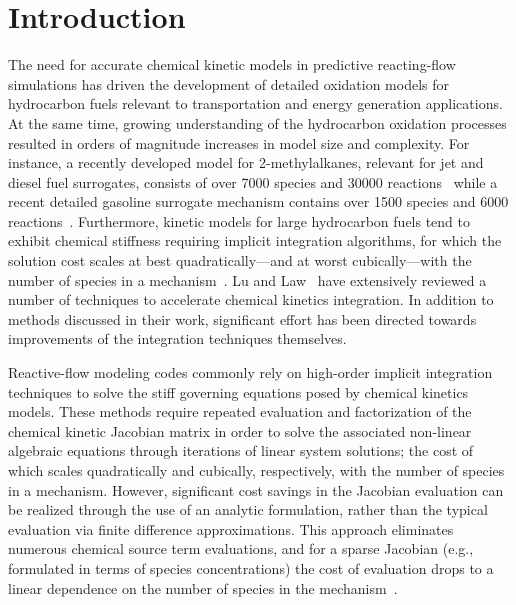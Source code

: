 \documentclass[preprint]{elsarticle}
\begin{document}
\clearpage

\section{Introduction}
\label{sec:Intro}

The need for accurate chemical kinetic models in predictive reacting-flow simulations has driven the development of detailed oxidation models for hydrocarbon fuels relevant to transportation and energy generation applications.
At the same time, growing understanding of the hydrocarbon oxidation processes resulted in orders of magnitude increases in model size and complexity.
For instance, a recently developed model for 2-methylalkanes, relevant for jet and diesel fuel surrogates, consists of over 7000 species and 30000 reactions~\cite{Sarathy:2011kx} while a recent detailed gasoline surrogate mechanism contains over 1500 species and 6000 reactions~\cite{Mehl:2011jn}.
Furthermore, kinetic models for large hydrocarbon fuels tend to exhibit chemical stiffness requiring implicit integration algorithms, for which the solution cost scales at best quadratically---and at worst cubically---with the number of species in a mechanism~\cite{Lu:2009gh}.
Lu and Law~\cite{Lu:2009gh} have extensively reviewed a number of techniques to accelerate chemical kinetics integration.
In addition to methods discussed in their work, significant effort has been directed towards improvements of the integration techniques themselves.

Reactive-flow modeling codes commonly rely on high-order implicit integration techniques to solve the stiff governing equations posed by chemical kinetics models.
These methods require repeated evaluation and factorization of the chemical kinetic Jacobian matrix in order to solve the associated non-linear algebraic equations through iterations of linear system solutions; the cost of which scales quadratically and cubically, respectively, with the number of species in a mechanism.
However, significant cost savings in the Jacobian evaluation can be realized through the use of an analytic formulation, rather than the typical evaluation via finite difference approximations.
This approach eliminates numerous chemical source term evaluations, and for a sparse Jacobian (e.g., formulated in terms of species concentrations) the cost of evaluation drops to a linear dependence on the number of species in the mechanism~\cite{Lu:2009gh}.
\end{document}
